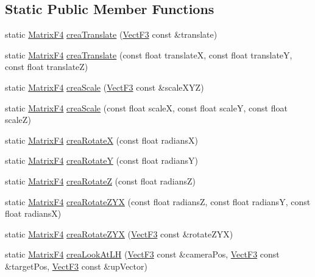 \subsection*{Static Public Member Functions}
\begin{DoxyCompactItemize}
\item 
static \hyperlink{classMatrixF4}{Matrix\-F4} \hyperlink{classMatrixTransform_a8dd2a9299ec647734bac7b102ca587a8}{crea\-Translate} (\hyperlink{classVectF3}{Vect\-F3} const \&translate)
\item 
static \hyperlink{classMatrixF4}{Matrix\-F4} \hyperlink{classMatrixTransform_a0876b127542db4f6d37ab5df59f25dd2}{crea\-Translate} (const float translate\-X, const float translate\-Y, const float translate\-Z)
\item 
static \hyperlink{classMatrixF4}{Matrix\-F4} \hyperlink{classMatrixTransform_a251c796e40b87980c32a0f142b1eb462}{crea\-Scale} (\hyperlink{classVectF3}{Vect\-F3} const \&scale\-X\-Y\-Z)
\item 
static \hyperlink{classMatrixF4}{Matrix\-F4} \hyperlink{classMatrixTransform_a3492c829cb4bced544895c76ab1ca57a}{crea\-Scale} (const float scale\-X, const float scale\-Y, const float scale\-Z)
\item 
static \hyperlink{classMatrixF4}{Matrix\-F4} \hyperlink{classMatrixTransform_af5fcb785703e6b6a9a7744320f8bfdc9}{crea\-Rotate\-X} (const float radians\-X)
\item 
static \hyperlink{classMatrixF4}{Matrix\-F4} \hyperlink{classMatrixTransform_a56c4b3216261eeca605f5eaff484f507}{crea\-Rotate\-Y} (const float radians\-Y)
\item 
static \hyperlink{classMatrixF4}{Matrix\-F4} \hyperlink{classMatrixTransform_aef68de02af8fec6c336b3c8cf6e9f1b0}{crea\-Rotate\-Z} (const float radians\-Z)
\item 
static \hyperlink{classMatrixF4}{Matrix\-F4} \hyperlink{classMatrixTransform_abdfe3c4ff1ea760ce109e6c6931407b4}{crea\-Rotate\-Z\-Y\-X} (const float radians\-Z, const float radians\-Y, const float radians\-X)
\item 
static \hyperlink{classMatrixF4}{Matrix\-F4} \hyperlink{classMatrixTransform_a86a6d522382fea9f569358f367340e02}{crea\-Rotate\-Z\-Y\-X} (\hyperlink{classVectF3}{Vect\-F3} const \&rotate\-Z\-Y\-X)
\item 
static \hyperlink{classMatrixF4}{Matrix\-F4} \hyperlink{classMatrixTransform_a33c9f1a0bec978be5d2f91a66cded741}{crea\-Look\-At\-L\-H} (\hyperlink{classVectF3}{Vect\-F3} const \&camera\-Pos, \hyperlink{classVectF3}{Vect\-F3} const \&target\-Pos, \hyperlink{classVectF3}{Vect\-F3} const \&up\-Vector)

\end{DoxyCompactItemize}
